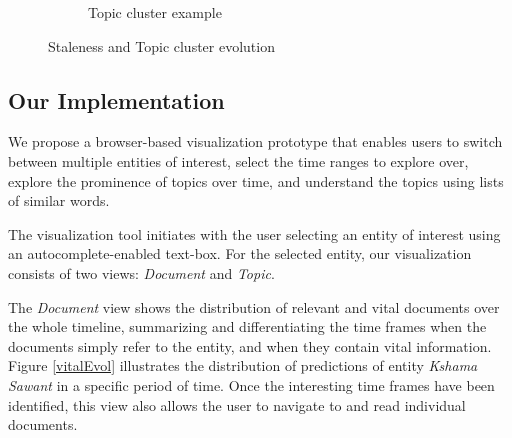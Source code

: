 \documentclass{article}
\begin{document}
\begin{figure}[tb]
\begin{subfigure}[b]{0.25\textwidth}
			\caption{Topic cluster example}
			\label{wordcloud}
        \end{subfigure}
        \caption{Staleness and Topic cluster evolution}
\end{figure}

\subsection{Our Implementation}

We propose a browser-based visualization prototype that enables users to switch between multiple entities of interest, select the time ranges to explore over, explore the prominence of topics over time, and understand the topics using lists of similar words.


The visualization tool initiates with the user selecting an entity of interest using an autocomplete-enabled text-box.
For the selected entity, our visualization consists of two views: \emph{Document} and \emph{Topic}.

The \emph{Document} view shows the distribution of relevant and vital documents over the whole timeline, summarizing and differentiating the time frames when the documents simply refer to the entity, and when they contain vital information.
Figure \ref{vitalEvol} illustrates the distribution of predictions of entity \emph{Kshama Sawant} in a specific period of time. %
Once the interesting time frames have been identified, this view also allows the user to navigate to and read individual documents. 
\end{document}
